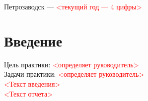\documentclass[a4paper,12pt]{article}
\begin{document}
\vfill

\begin{center}
\large
    Петрозаводск --- \textcolor{red}{<текущий год — 4 цифры>}
\end{center}



\newpage

\tableofcontents






\newpage
\section*{Введение}


Цель практики: \textcolor{red}{<определяет руководитель>} \\

Задачи практики: \textcolor{red}{<определяет руководитель>} \\

\textcolor{red}{<Текст введения>} \\

\textcolor{red}{<Текст отчета>} \\

\end{document}
